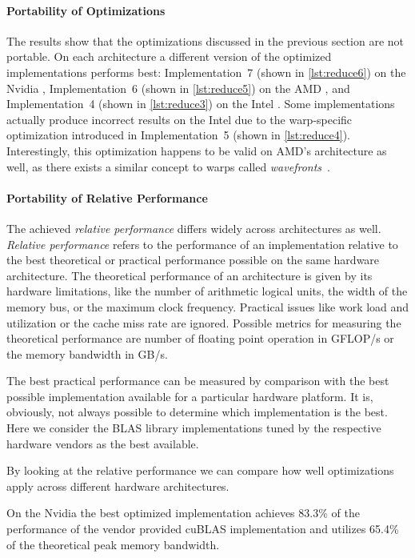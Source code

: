 \paragraph{Portability of Optimizations}
The results show that the optimizations discussed in the previous section are not portable. 
On each architecture a different version of the optimized implementations performs best:
Implementation~7 (shown in \autoref{lst:reduce6}) on the Nvidia \GPU, Implementation~6 (shown in \autoref{lst:reduce5}) on the AMD \GPU, and Implementation~4 (shown in \autoref{lst:reduce3}) on the Intel \CPU.
Some implementations actually produce incorrect results on the Intel \CPU due to the warp-specific optimization introduced in Implementation~5 (shown in \autoref{lst:reduce4}).
Interestingly, this optimization happens to be valid on AMD's \GPU architecture as well, as there exists a similar concept to warps called \emph{wavefronts}~\cite{AMDGCN2012}.

\paragraph{Portability of Relative Performance}
The achieved \emph{relative performance} differs widely across architectures as well.
\emph{Relative performance} refers to the performance of an implementation relative to the best theoretical or practical performance possible on the same hardware architecture.
The theoretical performance of an architecture is given by its hardware limitations, like the number of arithmetic logical units, the width of the memory bus, or the maximum clock frequency.
Practical issues like work load and utilization or the cache miss rate are ignored.
Possible metrics for measuring the theoretical performance are number of floating point operation in GFLOP/s or the memory bandwidth in GB/s.

The best practical performance can be measured by comparison with the best possible implementation available for a particular hardware platform.
It is, obviously, not always possible to determine which implementation is the best.
Here we consider the BLAS library implementations tuned by the respective hardware vendors as the best available.

By looking at the relative performance we can compare how well optimizations apply across different hardware architectures.

On the Nvidia \GPU the best optimized implementation achieves 83.3\% of the performance of the vendor provided cuBLAS implementation and utilizes 65.4\% of the theoretical peak memory bandwidth.

